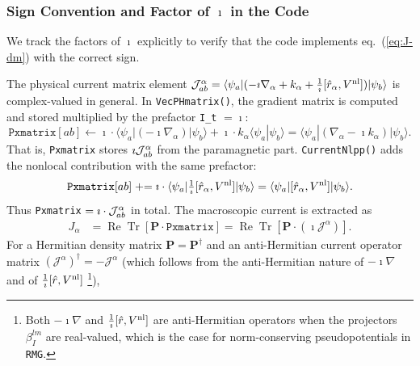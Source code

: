 \subsubsection{Sign Convention and Factor of $\imath$ in the Code}
\label{sec:imath-convention}

We track the factors of $\imath$ explicitly to verify that the code
implements eq.~(\ref{eq:J-dm}) with the correct sign.

The physical current matrix element
$\mathcal{J}^{\alpha}_{ab} = \langle\psi_a|(-\imath\nabla_\alpha + k_\alpha
+ \frac{1}{\imath}[\hat{r}_\alpha,V^{\mathrm{nl}}])|\psi_b\rangle$
is complex-valued in general.
In \texttt{VecPHmatrix()}, the gradient matrix is computed and stored
multiplied by the prefactor \texttt{I\_t} $= \imath$:
\begin{equation}
  \texttt{Pxmatrix}[ab]
  \leftarrow
  \imath\cdot\langle\psi_a|(-\imath\nabla_\alpha)|\psi_b\rangle
  + \imath\cdot k_\alpha\langle\psi_a|\psi_b\rangle
  = \langle\psi_a|(\nabla_\alpha - \imath k_\alpha)|\psi_b\rangle.
  \label{eq:stored-para}
\end{equation}
That is, \texttt{Pxmatrix} stores $\imath\mathcal{J}^{\alpha}_{ab}$ from
the paramagnetic part.
\texttt{CurrentNlpp()} adds the nonlocal contribution with the same
prefactor:
\begin{equation}
  \texttt{Pxmatrix}[ab]
  \mathrel{+}=
  \imath\cdot\langle\psi_a|
  \tfrac{1}{\imath}[\hat{r}_\alpha,V^{\mathrm{nl}}]|\psi_b\rangle
  = \langle\psi_a|[\hat{r}_\alpha,V^{\mathrm{nl}}]|\psi_b\rangle.
  \label{eq:stored-nlpp}
\end{equation}
Thus \texttt{Pxmatrix} $= \imath\cdot\mathcal{J}^{\alpha}_{ab}$ in total.
The macroscopic current is extracted as
\begin{align}
  J_\alpha
  &= \operatorname{Re}\operatorname{Tr}
     \!\left[\mathbf{P}\cdot\texttt{Pxmatrix}\right]
   = \operatorname{Re}\operatorname{Tr}
     \!\left[\mathbf{P}\cdot(\imath\boldsymbol{\mathcal{J}}^\alpha)\right].
  \label{eq:J-from-code}
\end{align}
For a Hermitian density matrix $\mathbf{P} = \mathbf{P}^\dag$
and an anti-Hermitian current operator matrix
$(\boldsymbol{\mathcal{J}}^\alpha)^\dag = -\boldsymbol{\mathcal{J}}^\alpha$
(which follows from the anti-Hermitian nature of $-\imath\nabla$
and of $\frac{1}{\imath}[\hat{r},V^{\mathrm{nl}}]$%
\footnote{Both $-\imath\nabla$ and $\frac{1}{\imath}[\hat{r},V^{\mathrm{nl}}]$
are anti-Hermitian operators when the projectors $\beta^{lm}_I$
are real-valued, which is the case for norm-conserving
pseudopotentials in \texttt{RMG}.}),
